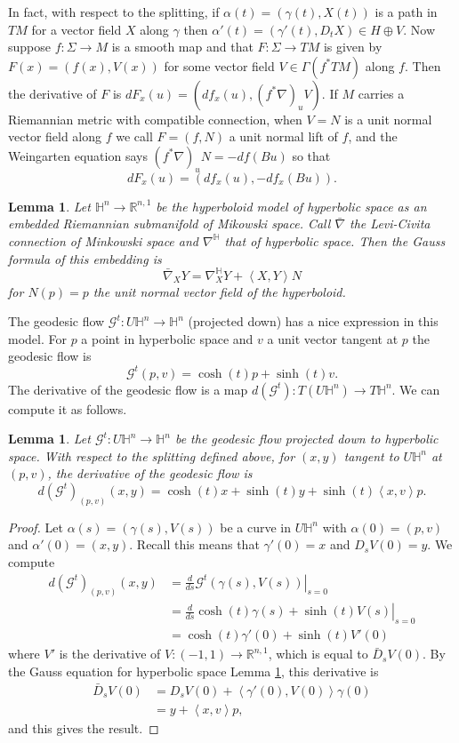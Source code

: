 \documentclass{amsart}
\newcommand{\R}{\mathbb{R}}
\newtheorem{lem}[thm]{Lemma}
\renewcommand{\H}{\mathbb{H}}
\begin{document}
In fact, with respect to the splitting, if $\alpha(t) = (\gamma(t),X(t))$ is a path in $TM$ for a vector field $X$ along $\gamma$ then $\alpha'(t) = (\gamma'(t),D_tX) \in H \oplus V$.
Now suppose $f:\Sigma \to M$ is a smooth map and that $F: \Sigma \to TM$ is given by $F(x) = (f(x),V(x))$ for some vector field $V \in \Gamma(f^*TM)$ along $f$.
Then the derivative of $F$ is $dF_x(u) = (df_x(u), (f^*\nabla)_u V)$.
If $M$ carries a Riemannian metric with compatible connection, when $V = N$ is a unit normal vector field along $f$ we call $F = (f,N)$ a unit normal lift of $f$, and the Weingarten equation says $(f^*\nabla)_uN = -df(Bu)$ so that 
\[
dF_x(u) = (df_x(u),-df_x(Bu)).
\]

\begin{lem}
\label{HypAsSub}
Let $\H^n \to \R^{n,1}$ be the hyperboloid model of hyperbolic space as an embedded Riemannian submanifold of Mikowski space. Call $\bar{\nabla}$ the Levi-Civita connection of Minkowski space and $\nabla^{\H}$ that of hyperbolic space. Then the Gauss formula of this embedding is 
\[
\bar{\nabla}_XY = \nabla^{\H}_XY + \left<X,Y\right>N
\]
for $N(p) = p$ the unit normal vector field of the hyperboloid.
\end{lem}

The geodesic flow $\mathcal{G}^t :U \H^n \to \H^n$ (projected down) has a nice expression in this model. 
For $p$ a point in hyperbolic space and $v$ a unit vector tangent at $p$ the geodesic flow is
\[
\mathcal{G}^t(p,v) = \cosh(t)p + \sinh(t)v.
\]
The derivative of the geodesic flow is a map $d(\mathcal{G}^t) : T(U\H^n) \to T\H^n$.
We can compute it as follows.

\begin{lem}
\label{DerGeo}
Let $\mathcal{G}^t: U\H^n \to \H^n$ be the geodesic flow projected down to hyperbolic space. With respect to the splitting defined above, for $(x,y)$ tangent to $U\H^n$ at $(p,v)$, the derivative of the geodesic flow is 
\[
d(\mathcal{G}^t)_{(p,v)}(x,y) = \cosh(t)x + \sinh(t)y + \sinh(t)\left<x,v\right>p.
\]
\end{lem}

\begin{proof}
Let $\alpha(s) = (\gamma(s),V(s))$ be a curve in $U\H^n$ with $\alpha(0) = (p,v)$ and $\alpha'(0) = (x,y)$. 
Recall this means that $\gamma'(0) = x$ and $D_sV(0) = y$.
We compute
\begin{align*}
d(\mathcal{G}^t)_{(p,v)}(x,y)
&= \left. \frac{d}{ds} \mathcal{G}^t(\gamma(s),V(s)) \right|_{s=0} \\
&= \left. \frac{d}{ds} \cosh(t)\gamma(s) + \sinh(t)V(s) \right|_{s=0} \\
&= \cosh(t)\gamma'(0) + \sinh(t)V'(0)
\end{align*}
where $V'$ is the derivative of $V: (-1,1) \to \R^{n,1}$, which is equal to $\bar{D}_sV(0)$.
By the Gauss equation for hyperbolic space Lemma \ref{HypAsSub}, this derivative is 
\begin{align*}
\bar{D}_sV(0) 
&= D_sV(0) + \left<\gamma'(0),V(0)\right>\gamma(0) \\
&= y + \left< x, v \right>p,
\end{align*}
and this gives the result. 
\end{proof}
\end{document}
